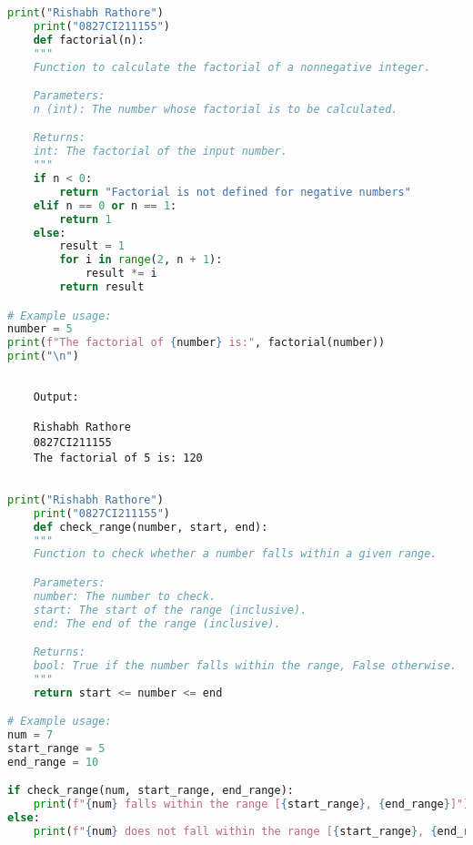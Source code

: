 \documentclass{report}
\begin{document}
\newpage


\sol 
\begin{lstlisting}[language=Python]
	print("Rishabh Rathore")
	print("0827CI211155")
	def factorial(n):
    """
    Function to calculate the factorial of a nonnegative integer.

    Parameters:
    n (int): The number whose factorial is to be calculated.

    Returns:
    int: The factorial of the input number.
    """
    if n < 0:
        return "Factorial is not defined for negative numbers"
    elif n == 0 or n == 1:
        return 1
    else:
        result = 1
        for i in range(2, n + 1):
            result *= i
        return result

# Example usage:
number = 5
print(f"The factorial of {number} is:", factorial(number))
print("\n")
  

\end{lstlisting}

\begin{verbatim}
	Output:

	Rishabh Rathore
	0827CI211155
	The factorial of 5 is: 120
	

\end{verbatim}

\newpage


\sol 
\begin{lstlisting}[language=Python]
	print("Rishabh Rathore")
	print("0827CI211155")
	def check_range(number, start, end):
    """
    Function to check whether a number falls within a given range.

    Parameters:
    number: The number to check.
    start: The start of the range (inclusive).
    end: The end of the range (inclusive).

    Returns:
    bool: True if the number falls within the range, False otherwise.
    """
    return start <= number <= end

# Example usage:
num = 7
start_range = 5
end_range = 10

if check_range(num, start_range, end_range):
    print(f"{num} falls within the range [{start_range}, {end_range}]")
else:
    print(f"{num} does not fall within the range [{start_range}, {end_range}]")
  

\end{lstlisting}
\end{document}
